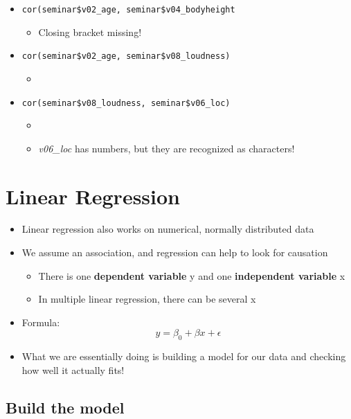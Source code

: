 \documentclass[
]{book}
\providecommand{\tightlist}{%
  \setlength{\itemsep}{0pt}\setlength{\parskip}{0pt}}
\begin{document}
\begin{itemize}
\tightlist
\item
  \texttt{cor(seminar\$v02\_age,\ seminar\$v04\_bodyheight}

  \begin{itemize}
  \tightlist
  \item
    Closing bracket missing!
  \end{itemize}
\item
  \texttt{cor(seminar\$v02\_age,\ seminar\$v08\_loudness)}

  \begin{itemize}
  \tightlist
  \item
  \end{itemize}
\item
  \texttt{cor(seminar\$v08\_loudness,\ seminar\$v06\_loc)}

  \begin{itemize}
  \tightlist
  \item
  \item
    \emph{v06\_loc} has numbers, but they are recognized as characters!
  \end{itemize}
\end{itemize}

\section{Linear Regression}\label{linear-regression}

\begin{itemize}
\tightlist
\item
  Linear regression also works on numerical, normally distributed data
\item
  We assume an association, and regression can help to look for causation

  \begin{itemize}
  \tightlist
  \item
    There is one \textbf{dependent variable} y and one \textbf{independent variable} x
  \item
    In multiple linear regression, there can be several x
  \end{itemize}
\item
  Formula: \[ y = \beta_0 + \beta x + \epsilon \]
\item
  What we are essentially doing is building a model for our data and checking how well it actually fits!
\end{itemize}

\subsection{Build the model}\label{build-the-model}
\end{document}
